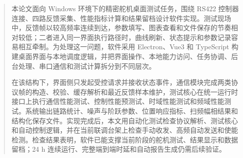 

\begin{abstract}
本论文面向 Windows 环境下的精密舵机桌面测试任务，围绕 RS422 控制器连接、四路反馈采集、性能指标计算和结果留档设计软件实现。测试现场中，反馈帧以较高频率连续到达，参数填写、图表查看和文件保存的节奏相对较低；二者进入同一界面执行路径时，曲线刷新、状态提示和参数记录容易相互牵制。为处理这一问题，软件采用 Electron、Vue3 和 TypeScript 构建桌面界面与本地调度逻辑，并把界面操作、本地能力访问、任务协调、后台处理、串口通信和测试计算拆分到不同层次。

在该结构下，界面侧只发起受控请求并接收状态事件，通信模块完成两类协议帧的构造、校验、缓存解析和最近反馈样本维护，测试核心在统一运行时接口上执行通信性能测试、控制性能预测试、时域性能测试和频域性能测试。系统输出链路统计、噪声与阶跃参数、位置响应指标、扫频幅相结果和结构化保存文件。实现完成后，本文用自动化测试检查协议解析、测试核心和自动控制逻辑，并在当前联调台架上检查手动收发、高频自动发送和使能检测。检查结果表明，软件已能支撑当前阶段的舵机测试、结果显示和数据留档；24 h 连续运行、完整端到端时延和自动报告生成仍需后续验证。
\end{abstract}

